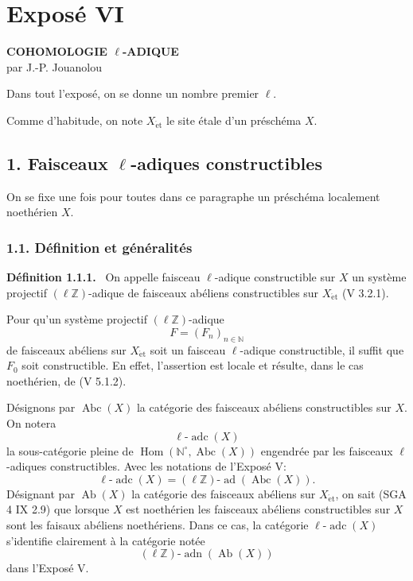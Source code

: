 \documentclass[11pt]{article}
\newenvironment{statement}[1]{\par\medskip\noindent\textbf{#1.}\ }{\par\medskip}
\DeclareMathOperator{\Hom}{Hom}
\providecommand{\Hom}{\operatorname{Hom}}
\providecommand{\adn}{\operatorname{adn}}
\providecommand{\Ab}{\operatorname{Ab}}
\providecommand{\Abc}{\operatorname{Abc}}
\providecommand{\adc}{\operatorname{adc}}
\providecommand{\ad}{\operatorname{ad}}
\providecommand{\adn}{\operatorname{adn}}
\providecommand{\Ab}{\operatorname{Ab}}
\begin{document}
\section*{Exposé VI}

\begin{center}
\textbf{COHOMOLOGIE \(\ell\)-ADIQUE}\\[0.5em]
par J.-P. Jouanolou
\end{center}

Dans tout l'exposé, on se donne un nombre premier \(\ell\).

Comme d'habitude, on note \(X_{\mathrm{\acute et}}\) le site étale d'un préschéma \(X\).

\subsection*{1. Faisceaux \(\ell\)-adiques constructibles}

On se fixe une fois pour toutes dans ce paragraphe un préschéma localement noethérien \(X\).

\subsubsection*{1.1. Définition et généralités}

\begin{statement}{Définition 1.1.1}
On appelle faisceau \(\ell\)-adique constructible sur \(X\) un système projectif \((\ell\mathbb Z)\)-adique de faisceaux abéliens constructibles sur \(X_{\mathrm{\acute et}}\) (V 3.2.1).
\end{statement}

Pour qu'un système projectif \((\ell\mathbb Z)\)-adique
\[
F=(F_n)_{n\in\mathbb N}
\]
de faisceaux abéliens sur \(X_{\mathrm{\acute et}}\) soit un faisceau \(\ell\)-adique constructible, il suffit que \(F_0\) soit constructible. En effet, l'assertion est locale et résulte, dans le cas noethérien, de (V 5.1.2).

Désignons par \(\Abc(X)\) la catégorie des faisceaux abéliens constructibles sur \(X\). On notera
\[
\ell\text{-}\adc(X)
\]
la sous-catégorie pleine de \(\Hom(\mathbb N^{\circ},\Abc(X))\) engendrée par les faisceaux \(\ell\)-adiques constructibles. Avec les notations de l'Exposé V:
\[
\ell\text{-}\adc(X)=(\ell\mathbb Z)\text{-}\ad(\Abc(X)).
\]
Désignant par \(\Ab(X)\) la catégorie des faisceaux abéliens sur \(X_{\mathrm{\acute et}}\), on sait (SGA 4 IX 2.9) que lorsque \(X\) est noethérien les faisceaux abéliens constructibles sur \(X\) sont les faisaux abéliens noethériens. Dans ce cas, la catégorie \(\ell\text{-}\adc(X)\) s'identifie clairement à la catégorie notée
\[
(\ell\mathbb Z)\text{-}\adn(\Ab(X))
\]
dans l'Exposé V.
\end{document}
